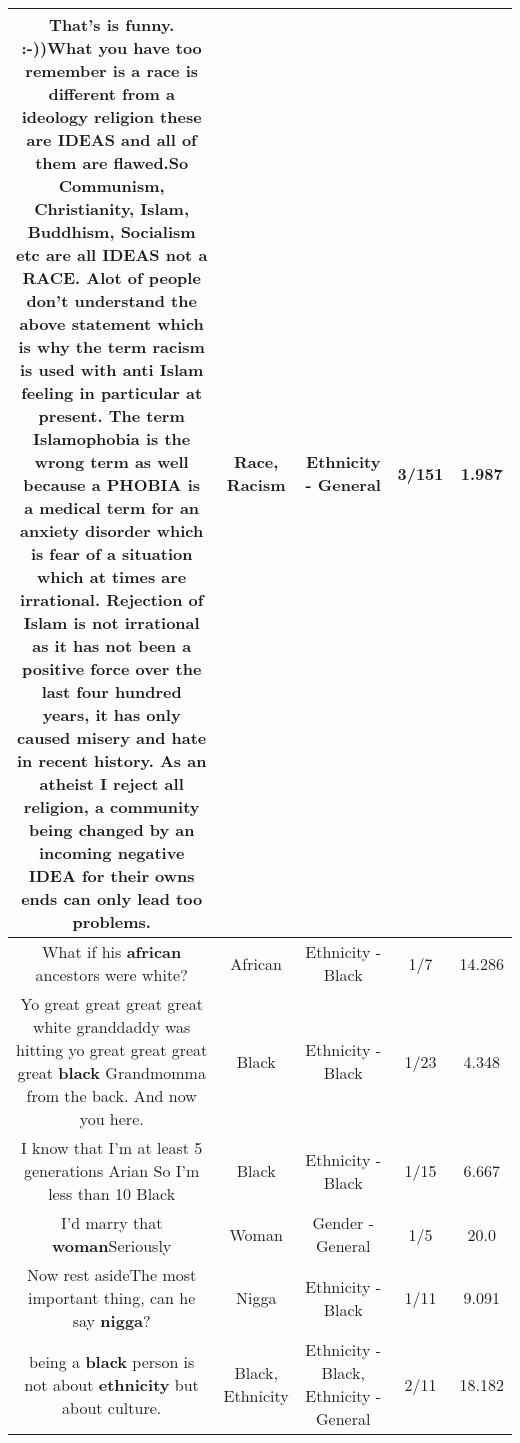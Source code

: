 \documentclass[11pt]{article}
\newlength\mylength
\begin{document}
\begin{center}
\begin{longtable}{|C{.65\mylength}|C{.30\mylength}|C{.12\mylength}|C{.12\mylength}|C{.12\mylength}|}
  \small That's is funny.  :-))What you have too remember is a \textbf{race} is different from a ideology  religion these are IDEAS and all of them are flawed.So Communism, Christianity, Islam, Buddhism, Socialism etc are all IDEAS not a \textbf{RACE}. Alot of people don't understand the above statement which is why the term \textbf{racism} is used with anti Islam feeling in particular at present. The term Islamophobia is the wrong term as well because a PHOBIA is a medical term for an anxiety disorder which is fear of a situation which at times are irrational. Rejection of Islam is not irrational as it has not been a positive force over the last four hundred years, it has only caused misery and hate in recent history. As an atheist I reject all religion, a community being changed by an incoming negative IDEA for their owns ends can only lead too problems.\normalsize   & Race, Racism & Ethnicity - General & 3/151 & 1.987 \\  \hline
  \small What if his \textbf{african} ancestors were white?\normalsize   & African & Ethnicity - Black & 1/7 & 14.286 \\  \hline
  \small Yo great great great great white granddaddy was hitting yo great great great great \textbf{black} Grandmomma from the back. And now you here.\normalsize   & Black & Ethnicity - Black & 1/23 & 4.348 \\  \hline
  \small I know that I'm at least 5 generations Arian So I'm less than 10 Black\normalsize   & Black & Ethnicity - Black & 1/15 & 6.667 \\  \hline
  \small I'd marry that \textbf{woman}Seriously\normalsize   & Woman & Gender - General & 1/5 & 20.0 \\  \hline
  \small Now rest asideThe most important thing, can he say \textbf{nigga}?\normalsize   & Nigga & Ethnicity - Black & 1/11 & 9.091 \\  \hline
  \small being a \textbf{black} person is not about \textbf{ethnicity} but about culture.\normalsize   & Black, Ethnicity & Ethnicity - Black, Ethnicity - General & 2/11 & 18.182 \\  \hline

\end{longtable}
\end{center}
\end{document}
